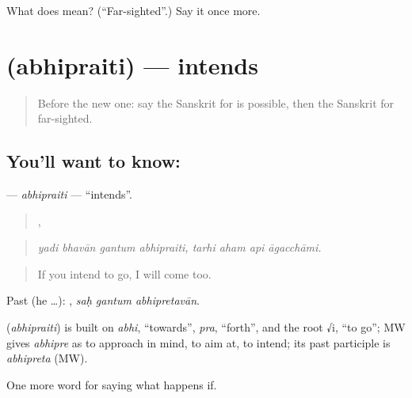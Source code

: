 \begin{tcolorbox}[breakable,colback=teal!4,colframe=teal!35!black,title={Before you move on}]
What does  mean? (\textquotedblleft{}Far-sighted\textquotedblright{}.) Say it once more.
\end{tcolorbox}
\section[\texorpdfstring{\sk{अभिप्रैति} (abhipraiti)}{अभिप्रैति (abhipraiti)}]{ (abhipraiti) — intends}

\label{lesson:SA-C554-abhipraiti}



\begin{quote}
Before the new one: say the Sanskrit for is possible, then the Sanskrit for far-sighted.
\end{quote}

\subsection*{You'll want to know: }
\textbf{} — \emph{abhipraiti} — \textquotedblleft{}intends\textquotedblright{}.

\begin{quote}
   ,    
\end{quote}

\begin{quote}
\emph{yadi bhavān gantum abhipraiti, tarhi aham api āgacchāmi.}
\end{quote}

\begin{quote}
If you intend to go, I will come too.
\end{quote}

Past (he …):   , \emph{saḥ gantum abhipretavān}.

\begin{cousinweb}
\textbf{} (\emph{abhipraiti}) is built on \emph{abhi}, \textquotedblleft{}towards\textquotedblright{}, \emph{pra}, \textquotedblleft{}forth\textquotedblright{}, and the root √i, \textquotedblleft{}to go\textquotedblright{}; MW gives \emph{abhipre} as to approach in mind, to aim at, to intend; its past participle is \emph{abhipreta} (MW).
\end{cousinweb}

\begin{grammarlens}[title={What you've built}]
One more word for saying what happens if.
\end{grammarlens}

